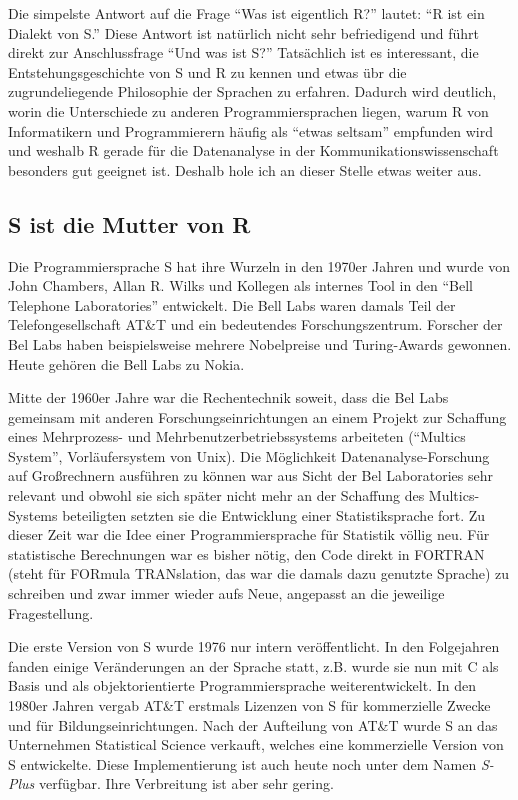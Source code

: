 \documentclass[
]{book}
\begin{document}
Die simpelste Antwort auf die Frage ``Was ist eigentlich R?'' lautet: ``R ist ein Dialekt von S.''
Diese Antwort ist natürlich nicht sehr befriedigend und führt direkt zur Anschlussfrage
``Und was ist S?'' Tatsächlich ist es interessant, die Entstehungsgeschichte von S und R zu kennen und
etwas übr die zugrundeliegende Philosophie der Sprachen zu erfahren.
Dadurch wird deutlich, worin die Unterschiede zu anderen Programmiersprachen liegen, warum
R von Informatikern und Programmierern häufig als ``etwas seltsam'' empfunden wird und weshalb R gerade
für die Datenanalyse in der Kommunikationswissenschaft besonders gut geeignet ist.
Deshalb hole ich an dieser Stelle etwas weiter aus.

\hypertarget{s-ist-die-mutter-von-r}{%
\subsection{S ist die Mutter von R}\label{s-ist-die-mutter-von-r}}

Die Programmiersprache S hat ihre Wurzeln in den 1970er Jahren und wurde von John Chambers,
Allan R. Wilks und Kollegen als internes Tool in den ``Bell Telephone Laboratories'' entwickelt.
Die Bell Labs waren damals Teil der Telefongesellschaft AT\&T und ein bedeutendes Forschungszentrum.
Forscher der Bel Labs haben beispielsweise mehrere Nobelpreise und Turing-Awards gewonnen.
Heute gehören die Bell Labs zu Nokia.

Mitte der 1960er Jahre war die Rechentechnik soweit, dass die Bel Labs gemeinsam mit anderen
Forschungseinrichtungen an einem Projekt zur Schaffung eines Mehrprozess- und Mehrbenutzerbetriebssystems arbeiteten (``Multics System'', Vorläufersystem von Unix).
Die Möglichkeit Datenanalyse-Forschung auf Großrechnern ausführen zu können war aus Sicht der Bel Laboratories sehr relevant und obwohl sie sich später nicht mehr an der Schaffung des Multics-Systems beteiligten setzten sie die Entwicklung einer Statistiksprache fort.
Zu dieser Zeit war die Idee einer Programmiersprache für Statistik völlig neu.
Für statistische Berechnungen war es bisher nötig, den Code direkt in FORTRAN (steht für FORmula TRANslation, das war die damals dazu genutzte Sprache) zu schreiben und zwar immer wieder aufs Neue, angepasst an die jeweilige Fragestellung.

Die erste Version von S wurde 1976 nur intern veröffentlicht. In den Folgejahren fanden einige
Veränderungen an der Sprache statt, z.B. wurde sie nun mit C als Basis und als objektorientierte
Programmiersprache weiterentwickelt. In den 1980er Jahren vergab AT\&T erstmals Lizenzen von S für
kommerzielle Zwecke und für Bildungseinrichtungen.
Nach der Aufteilung von AT\&T wurde S an das Unternehmen Statistical Science verkauft, welches eine kommerzielle Version von S entwickelte.
Diese Implementierung ist auch heute noch unter dem Namen \emph{S-Plus} verfügbar.
Ihre Verbreitung ist aber sehr gering.
\end{document}
